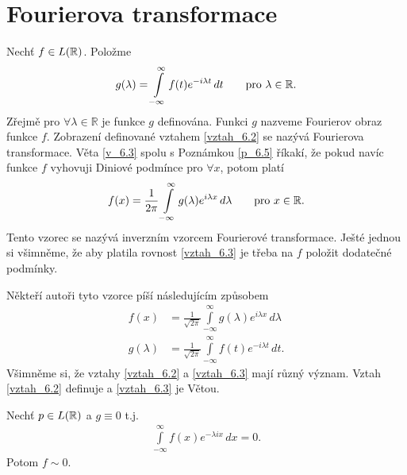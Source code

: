 \section{Fourierova transformace}
Nechť $f \in L(\mathbb{R})$. Položme 
\begin{align}\label{vztah_6.2}
g(\lambda)=\int \limits _{-\infty}^{\infty} f(t)e^{-i\lambda t}\, dt \qquad \text{pro $\lambda \in \mathbb{R}$.}
\end{align}
Zřejmě pro $\forall \lambda \in \mathbb{R}$ je funkce $g$ definována. Funkci $g$ nazveme Fourierov obraz funkce $f$. Zobrazení definované vztahem \eqref{vztah_6.2} se nazývá Fourierova transformace. Věta \ref{v_6.3} spolu s Poznámkou \ref{p_6.5} říkakí, že pokud navíc funkce $f$ vyhovuji Diniové podmínce pro $\forall x$, potom platí
\begin{align} \label{vztah_6.3}
f(x)=\frac{1}{2\pi}\int \limits _{-\infty}^{\infty} g(\lambda) e^{i\lambda x} \, d\lambda \qquad \text{pro $x \in \mathbb{R}$.}
\end{align}
Tento vzorec se nazývá inverzním vzorcem Fourierové transformace. Ješté jednou si všimněme, že aby platila rovnost \eqref{vztah_6.3} je třeba na $f$ položit dodatečné podmínky.

\begin{poznamka}
Někteří autoři tyto vzorce píší následujícím zp\r usobem
\begin{align*}
f(x)&=\frac{1}{\sqrt{2\pi}}\int \limits _{-\infty}^{\infty} g(\lambda) e^{i\lambda x} \, d\lambda \\
g(\lambda)&=\frac{1}{\sqrt{2\pi}} \int \limits _{-\infty}^{\infty} f(t)e^{-i\lambda t}\, dt.
\end{align*}
Všimněme si, že vztahy \eqref{vztah_6.2} a \eqref{vztah_6.3} mají r\r uzný význam. Vztah \eqref{vztah_6.2} definuje a \eqref{vztah_6.3} je Větou.
\end{poznamka}

\begin{theorem}\label{v_6.7}
Nechť $p \in L(\mathbb{R})$ a $g \equiv 0$ t.j. 
\begin{align}\label{vztah_6.4}
\int \limits _{-\infty}^{\infty} f(x) e^{-\lambda i x } \, dx = 0.
\end{align}
Potom $f \sim 0$.
\end{theorem}

